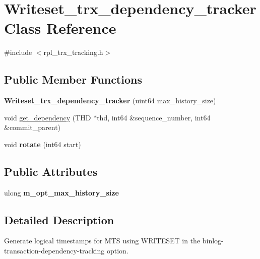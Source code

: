 \hypertarget{classWriteset__trx__dependency__tracker}{}\section{Writeset\+\_\+trx\+\_\+dependency\+\_\+tracker Class Reference}
\label{classWriteset__trx__dependency__tracker}


{\ttfamily \#include $<$rpl\+\_\+trx\+\_\+tracking.\+h$>$}

\subsection*{Public Member Functions}
\begin{DoxyCompactItemize}
\item 
\mbox{\label{classWriteset__trx__dependency__tracker_ac98836a5ea3d1214eb206ddc0c059412}} 
{\bfseries Writeset\+\_\+trx\+\_\+dependency\+\_\+tracker} (uint64 max\+\_\+history\+\_\+size)
\item 
void \mbox{\hyperlink{classWriteset__trx__dependency__tracker_a514b542a87479033fb55b0d7534a4dda}{get\+\_\+dependency}} (T\+HD $\ast$thd, int64 \&sequence\+\_\+number, int64 \&commit\+\_\+parent)
\item 
\mbox{\label{classWriteset__trx__dependency__tracker_a4a5a9266adfdaae474f879fc06732022}} 
void {\bfseries rotate} (int64 start)
\end{DoxyCompactItemize}
\subsection*{Public Attributes}
\begin{DoxyCompactItemize}
\item 
\mbox{\label{classWriteset__trx__dependency__tracker_a95b1acad032cdf93861a76df0d3e8a2a}} 
ulong {\bfseries m\+\_\+opt\+\_\+max\+\_\+history\+\_\+size}
\end{DoxyCompactItemize}


\subsection{Detailed Description}
Generate logical timestamps for M\+TS using W\+R\+I\+T\+E\+S\+ET in the binlog-\/transaction-\/dependency-\/tracking option. 


